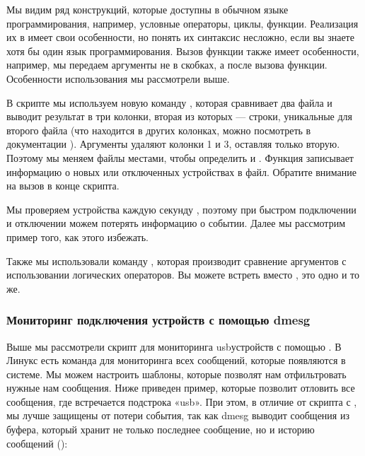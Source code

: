 \documentclass[letterpaper,10pt,russian]{sphinxmanual}
\begin{document}
\sphinxAtStartPar
Мы видим ряд конструкций, которые доступны в обычном языке программирования, например, условные операторы, циклы, функции. Реализация их в  имеет свои особенности, но понять их синтаксис несложно, если вы знаете хотя бы один язык программирования. Вызов функции также имеет особенности, например, мы передаем аргументы не в скобках, а после вызова функции. Особенности использования \sphinxcode{\sphinxupquote{\$}} мы рассмотрели выше.

\sphinxAtStartPar
В скрипте мы используем новую команду , которая сравнивает два файла и выводит результат в три колонки, вторая из которых — строки, уникальные для второго файла (что находится в других колонках, можно посмотреть в документации ). Аргументы  удаляют колонки 1 и 3, оставляя только вторую. Поэтому мы меняем файлы местами, чтобы определить  и . Функция  записывает информацию о новых или отключенных устройствах в файл. Обратите внимание на вызов  в конце скрипта.

\sphinxAtStartPar
Мы проверяем устройства каждую секунду , поэтому при быстром подключении и отключении можем потерять информацию о событии. Далее мы рассмотрим пример того, как этого избежать.

\sphinxAtStartPar
Также мы использовали команду , которая производит сравнение аргументов с использовании логических операторов. Вы можете встреть \sphinxcode{\sphinxupquote{{[}"\$new\_devices" != ""{]}}} вместо , это одно и то же.


\subsubsection{Мониторинг подключения устройств с помощью dmesg}
\label{\detokenize{educational_materials/bash/content:dmesg}}
\sphinxAtStartPar
Выше мы рассмотрели скрипт для мониторинга usb\sphinxhyphen{}устройств с помощью . В Линукс есть команда для мониторинга всех сообщений, которые появляются в системе. Мы можем настроить шаблоны, которые позволят нам отфильтровать нужные нам сообщения. Ниже приведен пример, которые позволит отловить все сообщения, где встречается подстрока «usb». При этом, в отличие от скрипта с , мы лучше защищены от потери события, так как dmesg выводит сообщения из буфера, который хранит не только последнее сообщение, но и историю сообщений ():
\end{document}
